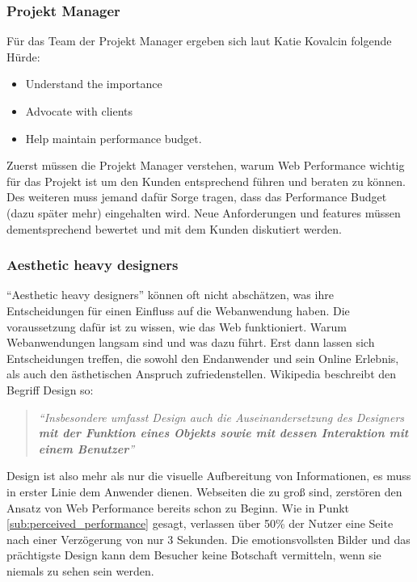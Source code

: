 		\subsubsection{Projekt Manager} %
		\label{ssub:projekt_manager}
			Für das Team der Projekt Manager ergeben sich laut Katie Kovalcin folgende Hürde: \autocite[p. 43]{kovalcin15}\\
			\begin{itemize}
				\item Understand the importance
				\item Advocate with clients
				\item Help maintain performance budget.
			\end{itemize}
			Zuerst müssen die Projekt Manager verstehen, warum Web Performance wichtig für das Projekt ist um den Kunden entsprechend führen und beraten zu können. Des weiteren muss jemand dafür Sorge tragen, dass das Performance Budget (dazu später mehr) eingehalten wird. Neue Anforderungen und features müssen dementsprechend bewertet und mit dem Kunden diskutiert werden.\\

		\subsubsection{Aesthetic heavy designers} %
		\label{ssub:aesthetic_heavy_designers}
			"`Aesthetic heavy designers"' können oft nicht abschätzen, was ihre Entscheidungen für einen Einfluss auf die Webanwendung haben. Die voraussetzung dafür ist zu wissen, wie das Web funktioniert. Warum Webanwendungen langsam sind und was dazu führt. Erst dann lassen sich Entscheidungen treffen, die sowohl den Endanwender und sein Online Erlebnis, als auch den ästhetischen Anspruch zufriedenstellen. Wikipedia beschreibt den Begriff Design so:

			\begin{quote}
				\textit{"`Insbesondere umfasst Design auch die Auseinandersetzung des Designers \textbf{mit der Funktion eines Objekts sowie mit dessen Interaktion mit einem Benutzer}"'} \autocite{wikipediaDesign}
			\end{quote}

			Design ist also mehr als nur die visuelle Aufbereitung von Informationen, es muss in erster Linie dem Anwender dienen. Webseiten die zu groß sind, zerstören den Ansatz von Web Performance bereits schon zu Beginn. Wie in Punkt \ref{sub:perceived_performance} gesagt, verlassen über 50\% der Nutzer eine Seite nach einer Verzögerung von nur 3 Sekunden. Die emotionsvollsten Bilder und das prächtigste Design kann dem Besucher keine Botschaft vermitteln, wenn sie niemals zu sehen sein werden.


